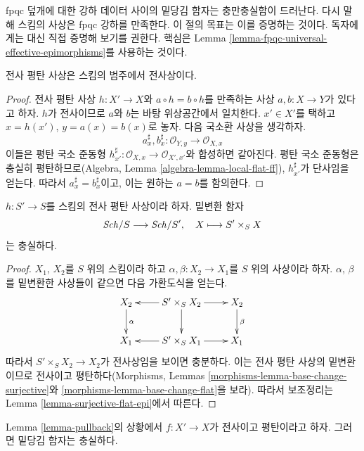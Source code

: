 \noindent
fpqc 덮개에 대한 강하 데이터 사이의 밑당김 함자는 충만충실함이
드러난다. 다시 말해 스킴의 사상은 fpqc 강하를 만족한다. 이 절의
목표는 이를 증명하는 것이다. 독자에게는 대신 직접 증명해 보기를
권한다. 핵심은 Lemma
\ref{lemma-fpqc-universal-effective-epimorphisms}를 사용하는 것이다.

\begin{lemma}
\label{lemma-surjective-flat-epi}
전사 평탄 사상은 스킴의 범주에서 전사상이다.
\end{lemma}

\begin{proof}
전사 평탄 사상 $h : X' \to X$와 $a \circ h = b \circ h$를 만족하는
사상 $a, b : X \to Y$가 있다고 하자. $h$가 전사이므로 $a$와 $b$는
바탕 위상공간에서 일치한다. $x' \in X'$를 택하고 $x = h(x')$,
$y = a(x) = b(x)$로 놓자. 다음 국소환 사상을 생각하자.
$$
a^\sharp_x, b^\sharp_x : \mathcal{O}_{Y, y} \to \mathcal{O}_{X, x}
$$
이들은 평탄 국소 준동형
$h^\sharp_{x'} : \mathcal{O}_{X, x} \to \mathcal{O}_{X', x'}$와
합성하면 같아진다. 평탄 국소 준동형은 충실히 평탄하므로(Algebra,
Lemma \ref{algebra-lemma-local-flat-ff}), $h^\sharp_{x'}$가 단사임을
얻는다. 따라서 $a^\sharp_x = b^\sharp_x$이고, 이는 원하는
$a = b$를 함의한다.
\end{proof}

\begin{lemma}
\label{lemma-ff-base-change-faithful}
$h : S' \to S$를 스킴의 전사 평탄 사상이라 하자. 밑변환 함자
$$
\mathit{Sch}/S \longrightarrow \mathit{Sch}/S', \quad
X \longmapsto S' \times_S X
$$
는 충실하다.
\end{lemma}

\begin{proof}
$X_1$, $X_2$를 $S$ 위의 스킴이라 하고
$\alpha, \beta : X_2 \to X_1$를 $S$ 위의 사상이라 하자.
$\alpha$, $\beta$를 밑변환한 사상들이 같으면 다음 가환도식을 얻는다.
$$
\xymatrix{
X_2 \ar[d]^\alpha &
S' \times_S X_2 \ar[l] \ar[d] \ar[r] &
X_2 \ar[d]^\beta \\
X_1 &
S' \times_S X_1 \ar[l] \ar[r] &
X_1
}
$$
따라서 $S' \times_S X_2 \to X_2$가 전사상임을 보이면 충분하다.
이는 전사 평탄 사상의 밑변환이므로 전사이고 평탄하다(Morphisms,
Lemmas \ref{morphisms-lemma-base-change-surjective}와
\ref{morphisms-lemma-base-change-flat}을 보라). 따라서 보조정리는
Lemma \ref{lemma-surjective-flat-epi}에서 따른다.
\end{proof}

\begin{lemma}
\label{lemma-faithful}
Lemma \ref{lemma-pullback}의 상황에서 $f : X' \to X$가 전사이고
평탄이라고 하자. 그러면 밑당김 함자는 충실하다.
\end{lemma}

